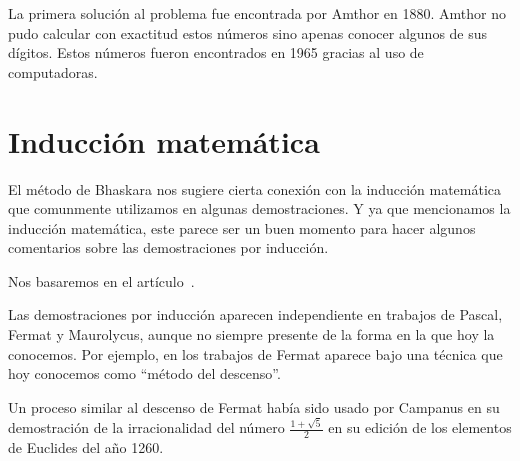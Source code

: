 La primera solución al problema fue encontrada por Amthor en 1880. Amthor no
pudo calcular con exactitud estos números sino apenas conocer algunos de sus
dígitos. Estos números fueron encontrados en 1965 gracias al uso de
computadoras. 



\section*{Inducción matemática}

El método de Bhaskara nos sugiere cierta conexión con la inducción matemática
que comunmente utilizamos en algunas demostraciones.  Y ya que mencionamos la
inducción matemática, este parece ser un buen momento para hacer algunos
comentarios sobre las demostraciones por inducción. 

Nos basaremos en el
artículo~\cite{MR1519060}. 

Las demostraciones por inducción aparecen
independiente en trabajos de Pascal, Fermat y Maurolycus, aunque no siempre
presente de la forma en la que hoy la conocemos. Por ejemplo, en los trabajos
de Fermat aparece bajo una técnica que hoy conocemos como ``método del descenso''. 

Un proceso similar al descenso de Fermat había sido usado por Campanus en su
demostración de la irracionalidad del número $\frac{1+\sqrt{5}}{2}$ en su
edición de los elementos de Euclides del año 1260. 

